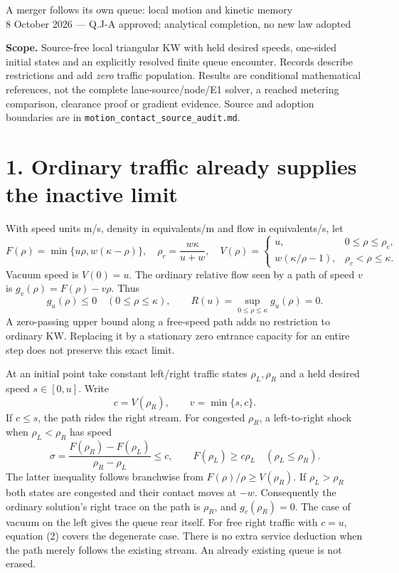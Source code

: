 \documentclass[11pt,a4paper]{article}
\begin{document}
{\Large A merger follows its own queue: local motion and kinetic memory}\\[4pt]
8 October 2026 --- Q.J-A approved; analytical completion, no new law adopted

\textbf{Scope.} Source-free local triangular KW with held desired speeds,
one-sided initial states and an explicitly resolved finite queue encounter.
Records describe restrictions and add \emph{zero} traffic population. Results
are conditional mathematical references, not the complete lane-source/node/E1
solver, a reached metering comparison, clearance proof or gradient evidence.
Source and adoption boundaries are in \texttt{motion\_contact\_source\_audit.md}.

\section*{1. Ordinary traffic already supplies the inactive limit}
With speed units m/s, density in equivalents/m and flow in equivalents/s, let
\begin{equation}
 F(\rho)=\min\{u\rho,w(\kappa-\rho)\},\quad
 \rho_c=\frac{w\kappa}{u+w},\quad
 V(\rho)=\begin{cases}u,&0\le\rho\le\rho_c,\\
 w(\kappa/\rho-1),&\rho_c<\rho\le\kappa.\end{cases}
\end{equation}
Vacuum speed is $V(0)=u$. The ordinary relative flow seen by a path of speed
$v$ is $g_v(\rho)=F(\rho)-v\rho$. Thus
\begin{equation}
 g_u(\rho)\le0\quad(0\le\rho\le\kappa),\qquad
 R(u)=\sup_{0\le\rho\le\kappa}g_u(\rho)=0.
\end{equation}
A zero-passing upper bound along a free-speed path adds no restriction to
ordinary KW. Replacing it by a stationary zero entrance capacity for an entire
step does not preserve this exact limit.

At an initial point take constant left/right traffic states $\rho_L,\rho_R$
and a held desired speed $s\in[0,u]$. Write
\begin{equation}
 c=V(\rho_R),\qquad v=\min\{s,c\}.
\end{equation}
If $c\le s$, the path rides the right stream. For congested $\rho_R$,
a left-to-right shock when $\rho_L<\rho_R$ has speed
\begin{equation}
 \sigma=\frac{F(\rho_R)-F(\rho_L)}{\rho_R-\rho_L}\le c,
 \qquad F(\rho_L)\ge c\rho_L\quad(\rho_L\le\rho_R).
\end{equation}
The latter inequality follows branchwise from $F(\rho)/\rho\ge V(\rho_R)$.
If $\rho_L>\rho_R$ both states are congested and their contact moves at $-w$.
Consequently the ordinary solution's right trace on the path is $\rho_R$,
and $g_c(\rho_R)=0$. The case of vacuum on the left gives the queue rear
itself. For free right traffic with $c=u$, equation (2) covers the degenerate
case. There is no extra service deduction when the path merely follows the
existing stream. An already existing queue is not erased.
\end{document}
